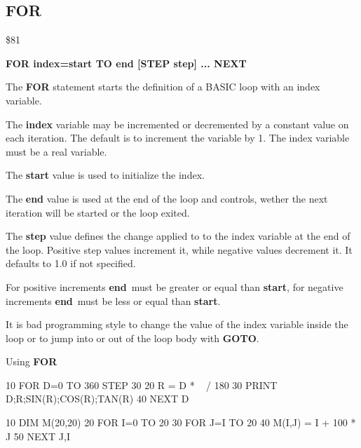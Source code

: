 
\newpage
\subsection{FOR}
\begin{description}[leftmargin=3cm,style=nextline]
\item [Token:] \$81
\item [Format:] {\bf FOR index=start TO end [STEP step] ... NEXT}
\item [Usage:] The {\bf FOR} statement starts the definition
               of a BASIC loop with an index variable.

               The {\bf index} variable may be incremented or decremented
               by a constant value on each iteration. The default
               is to increment the variable by 1.
               The index variable must be a real variable.

               The {\bf start} value is used to initialize the index.

               The {\bf end} value is used at the end of the loop
               and controls, wether the next iteration will be started
               or the loop exited.

               The {\bf step} value defines the change applied to
               to the index variable at the end of the loop.
               Positive step values increment it, while negative values
               decrement it. It defaults to 1.0 if not specified.

\item [Remarks:] For positive increments {\bf end} must be greater
               or equal than {\bf start}, for negative increments
               {\bf end} must be less or equal than {\bf start}.

               It is bad programming style to change the value
               of the index variable inside the loop or to
               jump into or out of the loop body with {\bf GOTO}.

\item [Example:] Using {\bf FOR}
\begin{screenoutput}
10 FOR D=0 TO 360 STEP 30
20 R = D * ~ / 180
30 PRINT D;R;SIN(R);COS(R);TAN(R)
40 NEXT D

10 DIM M(20,20)
20 FOR I=0 TO 20
30 FOR J=I TO 20
40 M(I,J) = I + 100 * J
50 NEXT J,I
\end{screenoutput}
\end{description}

